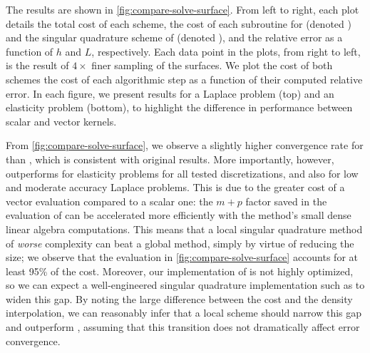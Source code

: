 The results are shown in \cref{fig:compare-solve-surface}. 
From left to right, each plot details the total cost of each scheme, the cost of each subroutine for \qbkix (denoted ) and the singular quadrature scheme of \cite{YBZ} (denoted ), and the relative error as a function of $h$ and $L$, respectively.
Each data point in the plots, from right to left, is the result of $4\times $ finer sampling of the surfaces.
We plot the cost of both schemes the cost of each algorithmic step as a function of their computed relative error. 
In each figure, we present results for a Laplace problem (top) and an elasticity problem (bottom), to highlight the difference in performance between scalar and vector kernels.

From \cref{fig:compare-solve-surface}, we observe a slightly higher convergence rate for \qbkix than \cite{YBZ}, which is consistent with original results.
More importantly, however, \cite{YBZ} outperforms \qbkix for elasticity problems for all tested discretizations, and also for low and moderate accuracy Laplace problems.
This is due to the greater cost of a vector \fmm evaluation compared to a scalar one: the $m+p$ factor saved in the \fmm evaluation of \cite{YBZ} can be accelerated more efficiently with the method's small dense linear algebra computations.
This means that a local singular quadrature method of \textit{worse} complexity can beat a global method, simply by virtue of reducing the \fmm size; we observe that the \fmm evaluation in \cref{fig:compare-solve-surface} accounts for at least 95\% of the \qbkix cost.
Moreover, our implementation of \cite{YBZ} is not highly optimized, so we can expect a well-engineered \pou singular quadrature implementation such as \cite{malhotra2019taylor} to widen this gap.
By noting the large difference between the \qbkix \fmm cost and the \qbkix density interpolation, we can reasonably infer that a local \qbkix scheme should narrow this gap and outperform \cite{YBZ}, assuming that this transition does not dramatically affect error convergence.

